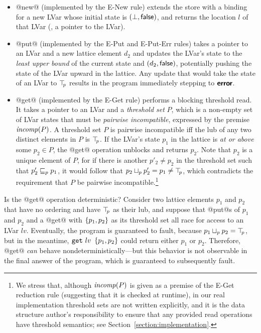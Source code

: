 \begin{itemize}
\item @new@ (implemented by the {\sc E-New} rule) extends the store
  with a binding for a new LVar whose initial state is $(\bot,
  \textsf{false})$, and returns the location $l$ of that LVar (\ie, a
  pointer to the LVar).
\item @put@ (implemented by the {\sc E-Put} and {\sc E-Put-Err} rules)
  takes a pointer to an LVar and a new lattice element $d_2$ and
  updates the LVar's state to the \emph{least upper bound} of the
  current state and $(d_2, \textsf{false})$, potentially pushing
  the state of the LVar upward in the lattice.  Any update that would
  take the state of an LVar to $\top\hspace{-0.85mm}_{p}$ results in the program
  immediately stepping to $\textbf{\textsf{error}}$.
\item @get@ (implemented by the {\sc E-Get} rule) performs a blocking
  threshold read.  It takes a pointer to an LVar and a \emph{threshold
    set} $P$, which is a non-empty set of LVar states that must be
  \emph{pairwise incompatible}, expressed by the premise $\mathit{incomp}(P)$.
  A threshold set $P$ is pairwise incompatible iff the lub of any two
  distinct elements in $P$ is $\top\hspace{-0.85mm}_{p}$.  If the LVar's state $p_1$ in
  the lattice is \emph{at or above} some $p_2 \in P$, the @get@
  operation unblocks and returns $p_2$.  Note that $p_2$ is a unique
  element of $P$, for if there is another $p'_2 \neq p_2$ in the
  threshold set such that $p'_2 \sqsubseteq_p p_1$, it would follow that
  $p_2 \sqcup_p p'_2 = p_1 \neq \top\hspace{-0.85mm}_{p}$, which contradicts the
  requirement that $P$ be pairwise incompatible.\footnote{We stress
    that, although $\mathit{incomp}(P)$ is given as a premise of the {\sc
      E-Get} reduction rule (suggesting that it is checked at
    runtime), in our real implementation threshold sets are not
    written explicitly, and it is the data structure author's
    responsibility to ensure that any provided read operations have
    threshold semantics; see Section~\ref{section:implementation}.}
\end{itemize}

Is the @get@ operation deterministic?  Consider two lattice elements
$p_1$ and $p_2$ that have no ordering and have $\top\hspace{-0.85mm}_{p}$ as their lub,
and suppose that @put@s of $p_1$ and $p_2$ and a @get@ with
$\left\{p_1, p_2\right\}$ as its threshold set all race for access to an LVar
$lv$.  Eventually, the program is guaranteed to fault, because
$p_1 \sqcup_p p_2 = \top\hspace{-0.85mm}_{p}$, but in the meantime,
$\mbox{\texttt{get}}~lv~\left\{p_1, p_2\right\}$ could return either $p_1$ or $p_2$.
Therefore, @get@ \emph{can} behave nondeterministically---but this
behavior is not observable in the final answer of the program, which
is guaranteed to subsequently fault.

